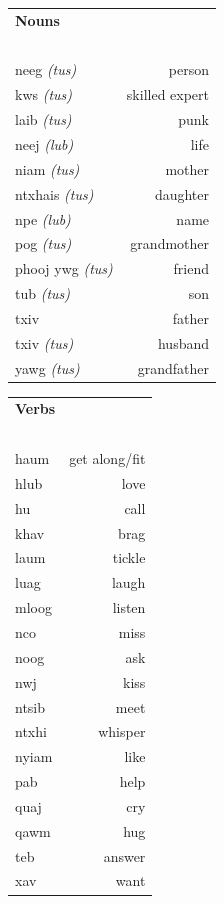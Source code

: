 \documentclass{article}
\begin{document}
\begin{multicols}{2}
[
\section*{}
]

\begin{tabular}{l r}
\textbf{Nouns} \\
~\\
neeg {\em (tus)} &person\\
kws {\em (tus)} &skilled expert\\
laib {\em (tus)} &punk\\
neej {\em (lub)} &life\\
niam {\em (tus)} &mother\\
ntxhais {\em (tus)} &daughter\\
npe {\em (lub)} &name\\
pog {\em (tus)} &grandmother\\
phooj ywg {\em (tus)} &friend\\
tub {\em (tus)} &son\\
txiv &father\\
txiv {\em (tus)} &husband\\
yawg {\em (tus)} &grandfather\\
\end{tabular}

\begin{tabular}{l r}
\textbf{Verbs} \\
~\\
haum &get along/fit\\
hlub &love\\
hu &call\\
khav &brag\\
laum &tickle\\
luag &laugh\\
mloog &listen\\
nco &miss\\
noog &ask\\
nwj &kiss\\
ntsib &meet\\
ntxhi &whisper\\
nyiam &like\\
pab &help\\
quaj &cry\\
qawm &hug\\
teb &answer\\
xav &want\\
\end{tabular}

\end{multicols}
\end{document}
